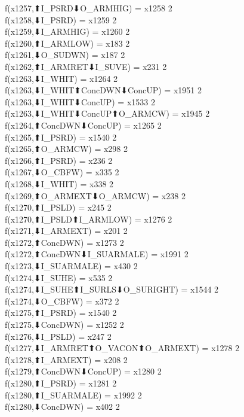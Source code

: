f(x1257,⬆I_PSRD⬇O_ARMHIG) = x1258 {2} \\
f(x1258,⬇I_PSRD) = x1259 {2} \\
f(x1259,⬇I_ARMHIG) = x1260 {2} \\
f(x1260,⬆I_ARMLOW) = x183 {2} \\
f(x1261,⬇O_SUDWN) = x187 {2} \\
f(x1262,⬆I_ARMRET⬇I_SUVE) = x231 {2} \\
f(x1263,⬇I_WHIT) = x1264 {2} \\
f(x1263,⬇I_WHIT⬆ConcDWN⬇ConcUP) = x1951 {2} \\
f(x1263,⬇I_WHIT⬇ConcUP) = x1533 {2} \\
f(x1263,⬇I_WHIT⬇ConcUP⬆O_ARMCW) = x1945 {2} \\
f(x1264,⬆ConcDWN⬇ConcUP) = x1265 {2} \\
f(x1265,⬆I_PSRD) = x1540 {2} \\
f(x1265,⬆O_ARMCW) = x298 {2} \\
f(x1266,⬆I_PSRD) = x236 {2} \\
f(x1267,⬇O_CBFW) = x335 {2} \\
f(x1268,⬇I_WHIT) = x338 {2} \\
f(x1269,⬆O_ARMEXT⬇O_ARMCW) = x238 {2} \\
f(x1270,⬆I_PSLD) = x245 {2} \\
f(x1270,⬆I_PSLD⬆I_ARMLOW) = x1276 {2} \\
f(x1271,⬇I_ARMEXT) = x201 {2} \\
f(x1272,⬆ConcDWN) = x1273 {2} \\
f(x1272,⬆ConcDWN⬇I_SUARMALE) = x1991 {2} \\
f(x1273,⬇I_SUARMALE) = x430 {2} \\
f(x1274,⬇I_SUHE) = x535 {2} \\
f(x1274,⬇I_SUHE⬆I_SURLS⬇O_SURIGHT) = x1544 {2} \\
f(x1274,⬇O_CBFW) = x372 {2} \\
f(x1275,⬆I_PSRD) = x1540 {2} \\
f(x1275,⬇ConcDWN) = x1252 {2} \\
f(x1276,⬇I_PSLD) = x247 {2} \\
f(x1277,⬇I_ARMRET⬆O_VACON⬆O_ARMEXT) = x1278 {2} \\
f(x1278,⬆I_ARMEXT) = x208 {2} \\
f(x1279,⬆ConcDWN⬇ConcUP) = x1280 {2} \\
f(x1280,⬆I_PSRD) = x1281 {2} \\
f(x1280,⬆I_SUARMALE) = x1992 {2} \\
f(x1280,⬇ConcDWN) = x402 {2} \\
